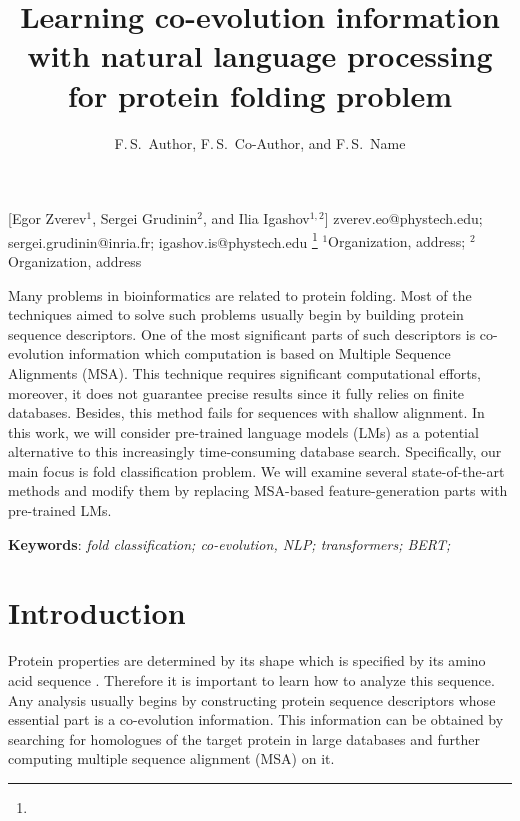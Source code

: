 \documentclass[12pt, twoside]{article}
\begin{document}
\English
\title
	[] %
    { Learning co-evolution information with natural language processing for protein folding problem} %
\author
	[F.\,S.~Author] %
	{F.\,S.~Author, F.\,S.~Co-Author, and F.\,S.~Name} %
    [Egor Zverev$^1$, Sergei Grudinin$^2$, and Ilia Igashov$^{1, 2}$] %
\email
    {zverev.eo@phystech.edu; sergei.grudinin@inria.fr; igashov.is@phystech.edu}
\thanks
    {}
\organization
    {$^1$Organization, address;
     $^2$Organization, address}
\abstract
    {Many problems in bioinformatics are related to protein folding. Most of the techniques aimed to solve such problems usually begin by building protein sequence descriptors. One of the most significant parts of such descriptors is co-evolution information which computation is based on Multiple Sequence Alignments (MSA). This technique requires significant computational efforts, moreover, it does not guarantee precise results since it fully relies on finite databases. Besides, this method fails for sequences with shallow alignment. In this work, we will consider pre-trained language models (LMs)  as a potential alternative to this increasingly time-consuming database search.  Specifically, our main focus is fold classification problem. We will examine several  state-of-the-art  methods  and  modify  them  by  replacing  MSA-based  feature-generation parts with pre-trained LMs.

		
	\noindent
    	\textbf{Keywords}: \emph{fold classification; co-evolution, NLP; transformers; BERT;  }}





\maketitle
\linenumbers

\section{Introduction}
\noindent %
Protein properties are determined by its shape which is specified by its amino acid sequence \cite{cellbiology}. Therefore it is important to learn how to analyze this sequence.
Any analysis usually begins by constructing protein sequence descriptors whose essential part is a co-evolution information. This information can be obtained by searching for homologues of the target protein in large databases and further computing multiple sequence alignment (MSA) on it. 
\end{document}

